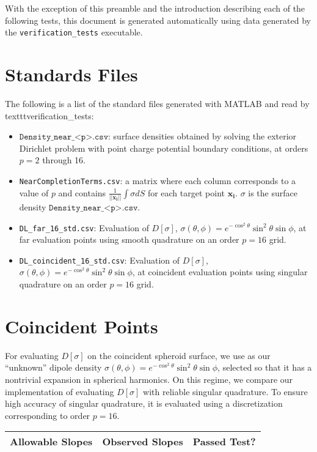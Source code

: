 \documentclass[12pt]{article}
\begin{document}
With the exception of this preamble and the introduction describing each of the following tests, this document is generated automatically using data generated by the \texttt{verification\_tests} executable.

\pagebreak

\section*{Standards Files}
The following is a list of the standard files generated with MATLAB and read by texttt{verification\_tests}:
\begin{itemize}
    \item $\texttt{Density\_near\_<p>.csv}$: surface densities  obtained by solving the exterior Dirichlet problem with point charge potential boundary conditions, at orders $p=2$ through 16.
    \item \texttt{NearCompletionTerms.csv}: a matrix where each column corresponds to a value of $p$ and contains $\frac{1}{||\mathbf{x_i}||}\int \sigma d S$ for each target point $\mathbf{x_i}$. $\sigma$ is the surface density $\texttt{Density\_near\_<p>.csv}$.
    \item \texttt{DL\_far\_16\_std.csv}: Evaluation of $D[\sigma]$, $\sigma(\theta,\phi)=e^{-\cos^2\theta} \sin^2\theta \sin\phi$, at far evaluation points using smooth quadrature on an order $p=16$ grid.
    \item \texttt{DL\_coincident\_16\_std.csv}: Evaluation of $D[\sigma]$, $\sigma(\theta,\phi)=e^{-\cos^2\theta} \sin^2\theta \sin\phi$, at coincident evaluation points using singular quadrature on an order $p=16$ grid.
\end{itemize}

\pagebreak

\section*{Coincident Points}
For evaluating $D[\sigma]$ on the coincident spheroid surface, we use as our ``unknown'' dipole density $\sigma(\theta,\phi)=e^{-\cos^2\theta} \sin^2\theta \sin\phi$, selected so that it has a nontrivial expansion in spherical harmonics. 
On this regime, we compare our implementation of evaluating $D[\sigma]$ with reliable singular quadrature.
To ensure high accuracy of singular quadrature, it is evaluated using a discretization corresponding to order $p=16$.

\begin{center}
\def\arraystretch{1.5}
\begin{tabular}{|c|c|c|} \hline
    Allowable Slopes & Observed Slopes & Passed Test?\\ \hline
    
\end{tabular}
\end{center}
\end{document}
